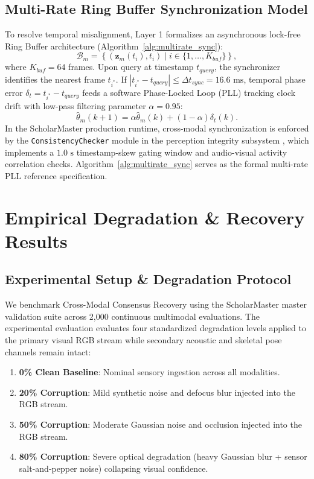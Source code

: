 \documentclass[conference]{IEEEtran}
\begin{document}
\subsection{Multi-Rate Ring Buffer Synchronization Model}
To resolve temporal misalignment, Layer 1 formalizes an asynchronous lock-free Ring Buffer architecture (Algorithm~\ref{alg:multirate_sync}):
\begin{equation}
\mathcal{B}_m = \left\{ (\mathbf{z}_m(t_i), t_i) \mid i \in \{1, \dots, K_{buf}\} \right\},
\end{equation}
where $K_{buf} = 64$ frames. Upon query at timestamp $t_{query}$, the synchronizer identifies the nearest frame $t_{i^*}$. If $|t_{i^*} - t_{query}| \le \Delta t_{sync} = 16.6\text{ ms}$, temporal phase error $\delta_t = t_{i^*} - t_{query}$ feeds a software Phase-Locked Loop (PLL) tracking clock drift with low-pass filtering parameter $\alpha = 0.95$:
\begin{equation}
\hat{\theta}_m(k+1) = \alpha \hat{\theta}_m(k) + (1 - \alpha) \delta_t(k).
\end{equation}
In the ScholarMaster production runtime, cross-modal synchronization is enforced by the \texttt{ConsistencyChecker} module in the perception integrity subsystem \cite{kumar2026scholar22}, which implements a $1.0\text{ s}$ timestamp-skew gating window and audio-visual activity correlation checks. Algorithm~\ref{alg:multirate_sync} serves as the formal multi-rate PLL reference specification.

\section{Empirical Degradation \& Recovery Results}
\subsection{Experimental Setup \& Degradation Protocol}
We benchmark Cross-Modal Consensus Recovery using the ScholarMaster master validation suite across 2,000 continuous multimodal evaluations. The experimental evaluation evaluates four standardized degradation levels applied to the primary visual RGB stream while secondary acoustic and skeletal pose channels remain intact:
\begin{enumerate}
    \item \textbf{0\% Clean Baseline}: Nominal sensory ingestion across all modalities.
    \item \textbf{20\% Corruption}: Mild synthetic noise and defocus blur injected into the RGB stream.
    \item \textbf{50\% Corruption}: Moderate Gaussian noise and occlusion injected into the RGB stream.
    \item \textbf{80\% Corruption}: Severe optical degradation (heavy Gaussian blur + sensor salt-and-pepper noise) collapsing visual confidence.
\end{enumerate}
\end{document}
